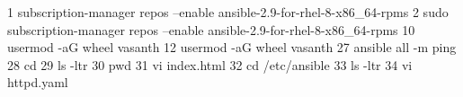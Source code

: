  1  subscription-manager repos --enable ansible-2.9-for-rhel-8-x86_64-rpms
    2  sudo subscription-manager repos --enable ansible-2.9-for-rhel-8-x86_64-rpms
   10  usermod -aG wheel vasanth
   12  usermod -aG wheel vasanth
   27  ansible all -m ping
   28  cd
   29  ls -ltr
   30  pwd
   31  vi index.html
   32  cd /etc/ansible
   33  ls -ltr
   34  vi httpd.yaml
